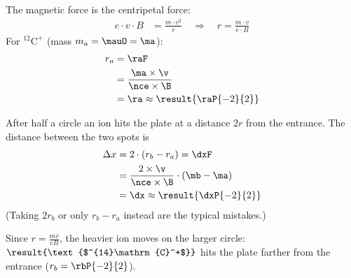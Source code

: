 \begin{abcliste}
\abc The magnetic force is the centripetal force:
\begin{align}
 e\cdot v\cdot B &= \frac{m\cdot v^2}{r} \quad\Longrightarrow\quad r = \frac{m\cdot v}{e\cdot B}
\end{align}
For $^{12}\mathrm{C}^+$ (mass $m_a = \mauO = \ma$):
\begin{align}
 r_a &= \raF \\
   &= \frac{\ma\times\v}{\nce\times\B} \\
   &= \ra \approx \result{\raP{-2}{2}}
\end{align}

\abc After half a circle an ion hits the plate at a distance $2r$ from the entrance. The distance between the two spots is
\begin{align}
 \Delta x &= 2\cdot\left(r_b-r_a\right) = \dxF \\
   &= \frac{2\times\v}{\nce\times\B}\cdot\left(\mb-\ma\right) \\
   &= \dx \approx \result{\dxP{-2}{2}}
\end{align}
(Taking $2 r_b$ or only $r_b-r_a$ instead are the typical mistakes.)

\abc Since $r = \frac{m v}{e B}$, the heavier ion moves on the larger circle: $\result{\text{$^{14}\mathrm{C}^+$}}$ hits the plate farther from the entrance ($r_b = \rbP{-2}{2}$).
\end{abcliste}
